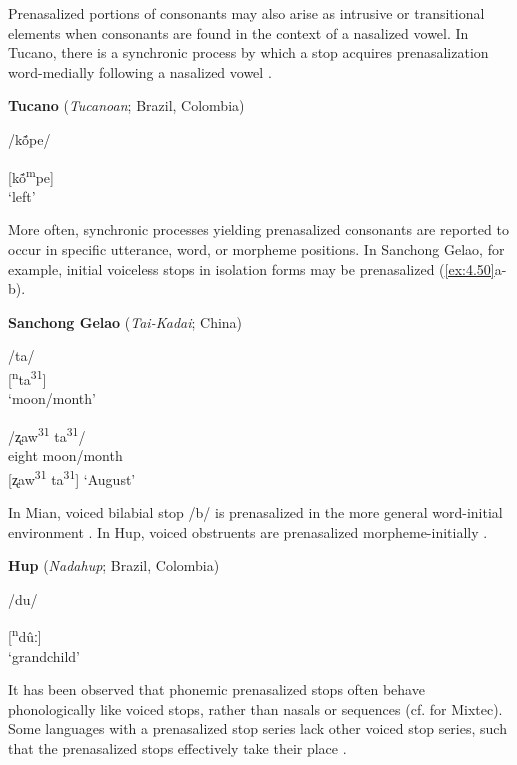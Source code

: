   Prenasalized portions of consonants may also arise as intrusive or transitional elements when consonants are found in the context of a nasalized vowel. In Tucano, there is a synchronic process by which a stop acquires prenasalization word-medially following a nasalized vowel .

\ea\label{ex:4.49}
  \textbf{Tucano} (\textit{Tucanoan}; Brazil, Colombia)

/kṍpe/

[kṍ\textsuperscript{m}pe]\\
\glt ‘left’
\citep[11]{West1980}
\z

  More often, synchronic processes yielding prenasalized consonants are reported to occur in specific utterance, word, or morpheme positions. In Sanchong Gelao, for example, initial voiceless stops in isolation forms may be prenasalized (\ref{ex:4.50}a-b).

\ea\label{ex:4.50}
  \textbf{Sanchong Gelao} (\textit{Tai-Kadai}; China)

\ea  /ta/\\{}
  [\textsuperscript{n}ta\textsuperscript{31}]\\
\glt  ‘moon/month’

\ex  /ʐaw\textsuperscript{31}   ta\textsuperscript{31}/\\
  eight   moon/month\\{}
  [ʐaw\textsuperscript{31} ta\textsuperscript{31}]
\glt  ‘August’
\citep[40]{Shen2003}
\z
\z

  In Mian, voiced bilabial stop /b/ is prenasalized in the more general word-initial environment \citep{Fedden2007}. In Hup, voiced obstruents are prenasalized morpheme-initially .

\ea\label{ex:4.51}
  \textbf{Hup} (\textit{Nadahup}; Brazil, Colombia)

/du/

[\textsuperscript{n}dûː]\\
\glt ‘grandchild’
\citep[54]{Epps2008}
\z

  It has been observed that phonemic prenasalized stops often behave phonologically like voiced stops, rather than nasals or sequences (cf. \citealt{IversonSalmons1996} for Mixtec). Some languages with a prenasalized stop series lack other voiced stop series, such that the prenasalized stops effectively take their place \citep[67-8]{Maddieson1984}.

